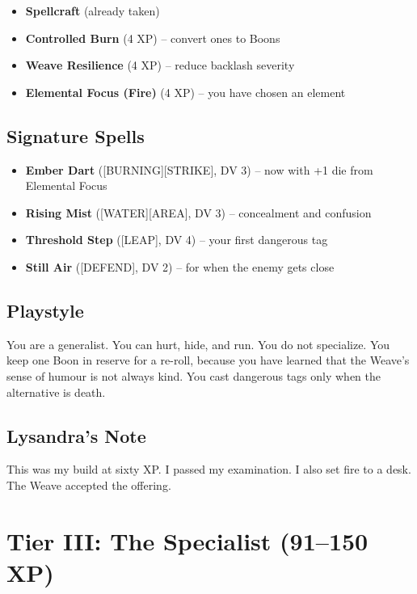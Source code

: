 \begin{itemize}
    \item \textbf{Spellcraft} (already taken)
    \item \textbf{Controlled Burn} (4 XP) -- convert ones to Boons
    \item \textbf{Weave Resilience} (4 XP) -- reduce backlash severity
    \item \textbf{Elemental Focus (Fire)} (4 XP) -- you have chosen an element
\end{itemize}

\subsection{Signature Spells}

\begin{itemize}
    \item \textbf{Ember Dart} ([BURNING][STRIKE], DV 3) -- now with +1 die from Elemental Focus
    \item \textbf{Rising Mist} ([WATER][AREA], DV 3) -- concealment and confusion
    \item \textbf{Threshold Step} ([LEAP], DV 4) -- your first dangerous tag
    \item \textbf{Still Air} ([DEFEND], DV 2) -- for when the enemy gets close
\end{itemize}

\subsection{Playstyle}

You are a generalist. You can hurt, hide, and run. You do not specialize. You keep one Boon in reserve for a re-roll, because you have learned that the Weave's sense of humour is not always kind. You cast dangerous tags only when the alternative is death.

\subsection{Lysandra's Note}

This was my build at sixty XP. I passed my examination. I also set fire to a desk. The Weave accepted the offering.

\section{Tier III: The Specialist (91--150 XP)}

